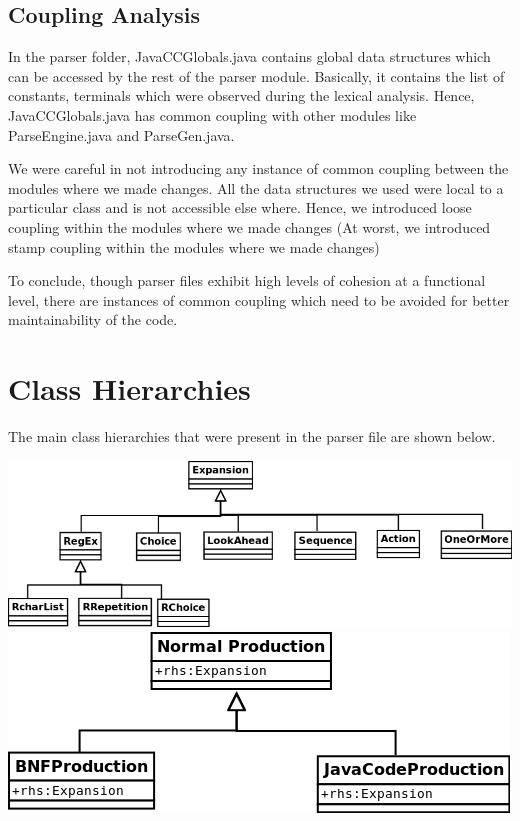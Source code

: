 \documentclass{article}
\begin{document}
\subsection*{Coupling Analysis}
In the parser folder, JavaCCGlobals.java contains global data structures which can be accessed by the rest of the parser module. Basically, it contains the list of constants, terminals which were observed during the lexical analysis. Hence, JavaCCGlobals.java has common coupling with other modules like ParseEngine.java and ParseGen.java. 

We were careful in not introducing any instance of common coupling between the modules where we made changes. All the data structures we used were local to a particular class and is not accessible else where. Hence, we introduced loose coupling within the modules where we made changes (At worst, we introduced stamp coupling within the modules where we made changes)   

To conclude, though parser files exhibit high levels of cohesion at a functional level, there are instances of common coupling which need to be avoided for better maintainability of the code.

\section{Class Hierarchies}
The main class hierarchies that were present in the parser file are shown below.
\begin{center}
\includegraphics[scale=0.35]{Expansion.png}    \includegraphics[scale=0.35]{NormalProduction.png} 
\end{center}
\end{document}
